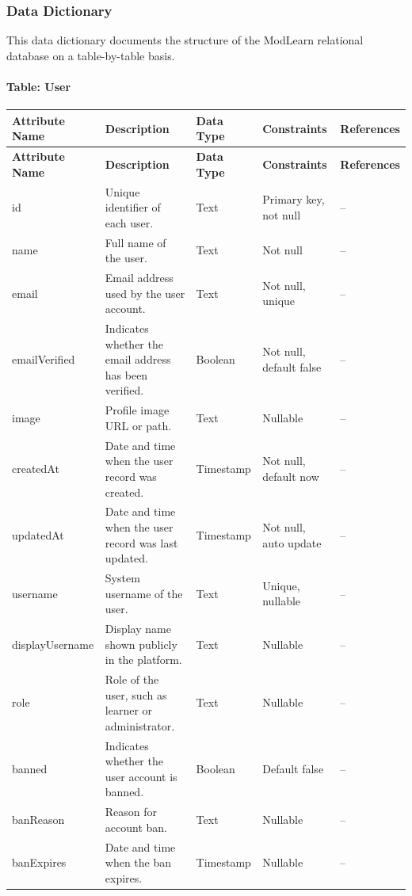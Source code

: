 \subsubsection{Data Dictionary}

This data dictionary documents the structure of the ModLearn relational database on a table-by-table basis.

\begingroup
\small
\renewcommand{\arraystretch}{1.15}

\newcommand{\ddheader}{
\toprule
\textbf{Attribute Name} & \textbf{Description} & \textbf{Data Type} & \textbf{Constraints} & \textbf{References} \\
\midrule
\endfirsthead
\toprule
\textbf{Attribute Name} & \textbf{Description} & \textbf{Data Type} & \textbf{Constraints} & \textbf{References} \\
\midrule
\endhead
\bottomrule
\endfoot
}

\paragraph{Table: User}
\begin{longtable}{L{2.6cm}L{4.5cm}L{2.1cm}L{3.3cm}L{2.2cm}}
\ddheader
id & Unique identifier of each user. & Text & Primary key, not null & -- \\
name & Full name of the user. & Text & Not null & -- \\
email & Email address used by the user account. & Text & Not null, unique & -- \\
emailVerified & Indicates whether the email address has been verified. & Boolean & Not null, default false & -- \\
image & Profile image URL or path. & Text & Nullable & -- \\
createdAt & Date and time when the user record was created. & Timestamp & Not null, default now & -- \\
updatedAt & Date and time when the user record was last updated. & Timestamp & Not null, auto update & -- \\
username & System username of the user. & Text & Unique, nullable & -- \\
displayUsername & Display name shown publicly in the platform. & Text & Nullable & -- \\
role & Role of the user, such as learner or administrator. & Text & Nullable & -- \\
banned & Indicates whether the user account is banned. & Boolean & Default false & -- \\
banReason & Reason for account ban. & Text & Nullable & -- \\
banExpires & Date and time when the ban expires. & Timestamp & Nullable & -- \\
\end{longtable}

